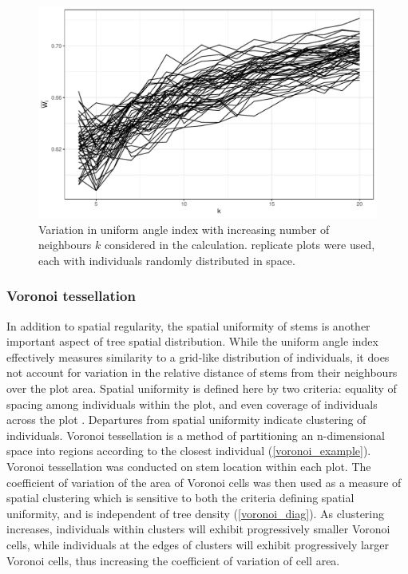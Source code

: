 \documentclass[11pt,a4paper]{article}
\begin{document}
\begin{figure}
\centering
	\includegraphics[width=\linewidth]{wi_k}
	\caption{Variation in uniform angle index with increasing number of neighbours $k$ considered in the calculation. \wikn{} replicate plots were used, each with \wiki{} individuals randomly distributed in space.}
	\label{wi_k}
\end{figure}

\subsubsection{Voronoi tessellation}

In addition to spatial regularity, the spatial uniformity of stems is another important aspect of tree spatial distribution. While the uniform angle index effectively measures similarity to a grid-like distribution of individuals, it does not account for variation in the relative distance of stems from their neighbours over the plot area. Spatial uniformity is defined here by two criteria: equality of spacing among individuals within the plot, and even coverage of individuals across the plot \citep{Ong2012}. Departures from spatial uniformity indicate clustering of individuals. Voronoi tessellation is a method of partitioning an n-dimensional space into regions according to the closest individual (\autoref{voronoi_example}). Voronoi tessellation was conducted on stem location within each plot. The coefficient of variation of the area of Voronoi cells was then used as a measure of spatial clustering which is sensitive to both the criteria defining spatial uniformity, and is independent of tree density (\autoref{voronoi_diag}). As clustering increases, individuals within clusters will exhibit progressively smaller Voronoi cells, while individuals at the edges of clusters will exhibit progressively larger Voronoi cells, thus increasing the coefficient of variation of cell area.
\end{document}
